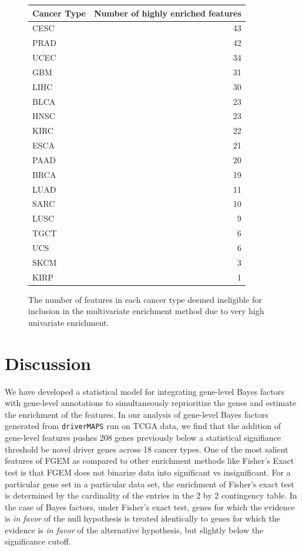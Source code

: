 \begin{figure}
    \centering
\begin{tabular}{l|r}
  \hline
  Cancer Type & Number of highly enriched features\\
  \hline
  CESC & 43\\
  \hline
  PRAD & 42\\
  \hline
  UCEC & 34\\
  \hline
  GBM & 31\\
  \hline
  LIHC & 30\\
  \hline
  BLCA & 23\\
  \hline
  HNSC & 23\\
  \hline
  KIRC & 22\\
  \hline
  ESCA & 21\\
  \hline
  PAAD & 20\\
  \hline
  BRCA & 19\\
  \hline
  LUAD & 11\\
  \hline
  SARC & 10\\
  \hline
  LUSC & 9\\
  \hline
  TGCT & 6\\
  \hline
  UCS & 6\\
  \hline
  SKCM & 3\\
  \hline
  KIRP & 1\\
  \hline
\end{tabular}\label{fig:n_enriched}
    \caption{The number of features in each cancer type deemed ineligible for inclusion in the multivariate enrichment method due to very high univariate enrichment.}
\end{figure}


\section{Discussion}\label{sec:org3165b14}

We have developed a statistical model for integrating gene-level Bayes factors with gene-level annotations to simultaneously reprioritize the genes and estimate the enrichment of the features. In our analysis of gene-level Bayes factors generated from \texttt{driverMAPS} run on TCGA data, we find that the addition of gene-level features pushes 208 genes previously below a statistical signifiance threshold be novel driver genes across 18 cancer types.
One of the most salient features of FGEM as compared to other enrichment methods like Fisher's Exact test is that FGEM does not binarize data into significant vs insignificant.  For a particular gene set in a particular data set, the enrichment of Fisher's exact test is determined by the cardinality of the entries in the 2 by 2 contingency table.  In the case of Bayes factors, under Fisher's exact test, genes for which the evidence is \emph{in favor} of the null hypothesis is treated identically to genes for which the evidence is \emph{in favor} of the alternative hypothesis, but slightly below the significance cutoff. 

